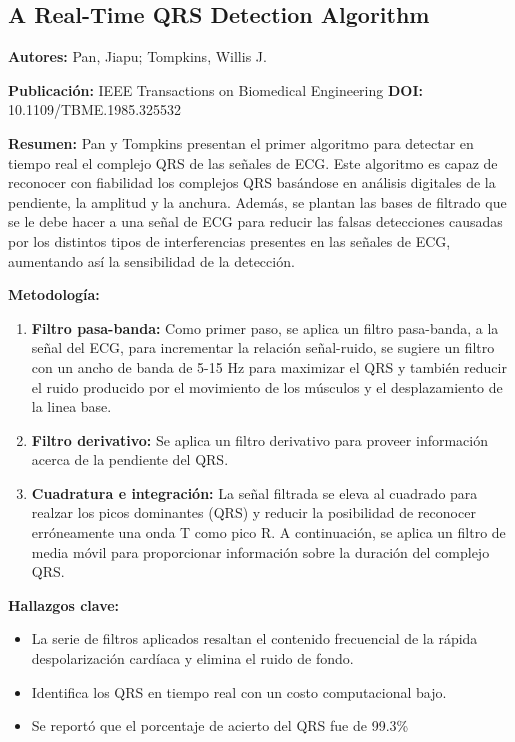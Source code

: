 \documentclass[spanish,11pt,letterpaper,oneside]{memoir}
\begin{document}
\subsection{A Real-Time QRS Detection Algorithm \cite{PanTompkins85}}
\textbf{Autores:} Pan, Jiapu; Tompkins, Willis J. 

\textbf{Publicación:} IEEE Transactions on Biomedical Engineering
\textbf{DOI:} 10.1109/TBME.1985.325532

\textbf{Resumen:} Pan y Tompkins presentan el primer algoritmo para detectar en tiempo real el complejo QRS de las señales de ECG. Este algoritmo es capaz de reconocer con fiabilidad los complejos QRS basándose en análisis digitales de la pendiente, la amplitud y la anchura. Además, se plantan las bases de filtrado que se le debe hacer a una señal de ECG para reducir las falsas detecciones causadas por los distintos tipos de interferencias presentes en las señales de ECG, aumentando así la sensibilidad de la detección.

\textbf{Metodología:} 
\begin{enumerate}
	\item \textbf{Filtro pasa-banda:} Como primer paso, se aplica un filtro pasa-banda, a la señal del ECG, para incrementar la relación señal-ruido, se sugiere un filtro con un ancho de banda de 5-15 Hz para maximizar el QRS y también reducir el ruido producido por el movimiento de los músculos y el desplazamiento de la linea base.
	\item \textbf{Filtro derivativo:} Se aplica un filtro derivativo para proveer información acerca de la pendiente del QRS.
	\item \textbf{Cuadratura e integración:} La señal filtrada se eleva al cuadrado para realzar los picos dominantes (QRS) y reducir la posibilidad de reconocer erróneamente una onda T como pico R. A continuación, se aplica un filtro de media móvil para proporcionar información sobre la duración del complejo QRS.
\end{enumerate}
	
\textbf{Hallazgos clave:}
\begin{itemize}
	\item La serie de filtros aplicados resaltan el contenido frecuencial de la rápida despolarización cardíaca y elimina el ruido de fondo.
	\item Identifica los QRS en tiempo real con un costo computacional bajo.
	\item Se reportó que el porcentaje de acierto del QRS fue de 99.3\%
\end{itemize}
\end{document}
